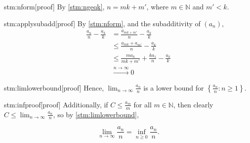 \begin{stm}{stm:nform}[proof]
By \ref{stm:ngeqk}, $n = mk + m'$, where $m \in \mathbb{N}$ and $m' < k$.
\end{stm}

\begin{stm}{stm:applysubadd}[proof]
By \ref{stm:nform}, and the subadditivity of $(a_n)$,
\begin{align*}
\frac{a_n}{n} - \frac{a_k}{k} &=\frac{a_{mk + m'}}{n} - \frac{a_k}{k} \\
&\le \frac{a_{mk} + a_{m'}}{n} - \frac{a_k}{k} \\
&\le \frac{ma_k}{mk + m'} + \frac{k a_1}{n} - \frac{a_k}{k} \\
&\xrightarrow{n \to \infty} 0
\end{align*}
\end{stm}

\begin{stm}{stm:limlowerbound}[proof]
Hence, $\lim_{n \to \infty} \frac{a_n}{n}$ is a lower bound for $\left\{ \frac{a_n}{n} : n \ge 1 \right\}$.
\end{stm}

\begin{stm}{stm:infproof}[proof]
Additionally, if $C \le \frac{a_m}{m}$ for all $m \in \mathbb{N}$, then clearly $C \le \lim_{n \to \infty} \frac{a_n}{n}$, so by \ref{stm:limlowerbound},

\[
\lim_{n \to \infty} \frac{a_n}{n} = \inf_{n \ge 0} \frac{a_n}{n}.
\]
\end{stm}
